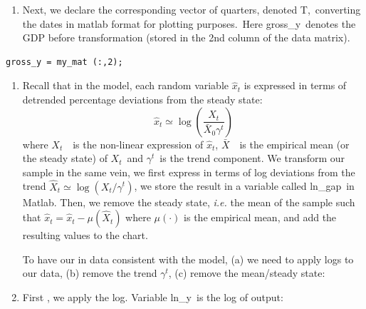\documentclass[a4paper,12pt]{article}%
\begin{document}
\begin{enumerate}
\item[5.] Next, we declare the corresponding vector of quarters, denoted
\textsf{T},\ converting the dates in matlab format for plotting
purposes.\ Here \textsf{gross\_y}\ denotes the GDP before transformation
(stored in the 2nd column of the data matrix).
\end{enumerate}

%

\vspace{1ex}
\begin{verbatim}
gross_y = my_mat (:,2);
\end{verbatim}
\vspace{1ex}%


\begin{enumerate}
\item[6.] Recall that in the model, each random variable $\hat{x}_{t}$ is
expressed in terms of detrended percentage deviations from the steady state:%
\begin{equation}
\hat{x}_{t}\simeq\log\left(  \frac{X_{t}}{\bar{X}_{0}\gamma^{t}}\right)
\end{equation}
where $X_{t}$\ \ is the non-linear expression of $\hat{x}_{t}$, $\bar{X}%
$\ \ is the empirical mean (or the steady state) of $X_{t}$\ and $\gamma^{t}%
$\ is the trend component. We transform our sample in the same vein, we first
express in terms of log deviations from the trend $\hat{X}_{t}\simeq
\log\left(  X_{t}/\gamma^{t}\right)  $, we store the result in a variable
called \textsf{ln\_gap}\ in Matlab. Then, we remove the steady state,\textit{
i.e.} the mean of the sample such that $\hat{x}_{t}=\hat{x}_{t}-\mu\left(
\hat{X}_{t}\right)  $ where $\mu(\cdot)$ is the empirical mean, and add the
resulting values to the chart.

To have our in data consistent with the model, (a) we need to apply logs to
our data, (b) remove the trend $\gamma^{t}$, (c) remove the mean/steady state:

\item[a] First , we apply the log. Variable \textsf{ln\_y}\ is the log of output:
\end{enumerate}
\end{document}
